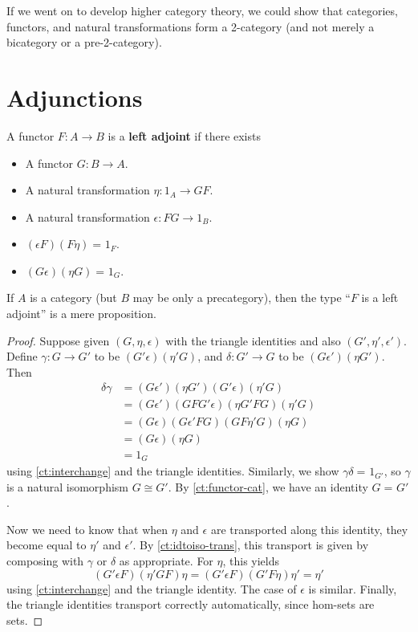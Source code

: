 \documentclass{amsart}
\newcommand{\id}[3][]{\ensuremath{#2 =_{#1} #3}\xspace}
\theoremstyle{definition}
\theoremstyle{remark}
\numberwithin{equation}{section}
\begin{document}
If we went on to develop higher category theory, we could show that categories, functors, and natural transformations form a 2-category (and not merely a bicategory or a pre-2-category).


\section{Adjunctions}
\label{sec:adjunctions}

\begin{defn}\label{def:adjoint}
  A functor $F:A\to B$ is a \textbf{left adjoint} if there exists
  \begin{itemize}
  \item A functor $G:B\to A$.
  \item A natural transformation $\eta:1_A \to GF$.
  \item A natural transformation $\epsilon:FG\to 1_B$.
  \item $\id{(\epsilon F)(F\eta)}{1_F}$.
  \item $\id{(G\epsilon)(\eta G)}{1_G}$.
  \end{itemize}
\end{defn}

\begin{lem}\label{ct:adjprop}
  If $A$ is a category (but $B$ may be only a precategory), then the type ``$F$ is a left adjoint'' is a mere proposition.
\end{lem}
\begin{proof}
  Suppose given $(G,\eta,\epsilon)$ with the triangle identities and also $(G',\eta',\epsilon')$.
  Define $\gamma:G\to G'$ to be $(G'\epsilon)(\eta' G)$, and $\delta:G'\to G$ to be $(G\epsilon')(\eta G')$.
  Then
  \begin{align*}
    \delta\gamma &=
    (G\epsilon')(\eta G')(G'\epsilon)(\eta'G)\\
    &= (G\epsilon')(G F G'\epsilon)(\eta G' F G)(\eta'G)\\
    &= (G\epsilon)(G\epsilon'FG)(G F \eta' G)(\eta G)\\
    &= (G\epsilon)(\eta G)\\
    &= 1_G
  \end{align*}
  using \autoref{ct:interchange} and the triangle identities.
  Similarly, we show $\id{\gamma\delta}{1_{G'}}$, so $\gamma$ is a natural isomorphism $G\cong G'$.
  By \autoref{ct:functor-cat}, we have an identity $\id G {G'}$.

  Now we need to know that when $\eta$ and $\epsilon$ are transported along this identity, they become equal to $\eta'$ and $\epsilon'$.
  By \autoref{ct:idtoiso-trans}, this transport is given by composing with $\gamma$ or $\delta$ as appropriate.
  For $\eta$, this yields
  \begin{equation*}
    (G'\epsilon F)(\eta'GF)\eta
    = (G'\epsilon F)(G'F\eta)\eta'
    = \eta'
  \end{equation*}
  using \autoref{ct:interchange} and the triangle identity.
  The case of $\epsilon$ is similar.
  Finally, the triangle identities transport correctly automatically, since hom-sets are sets.
\end{proof}
\end{document}
